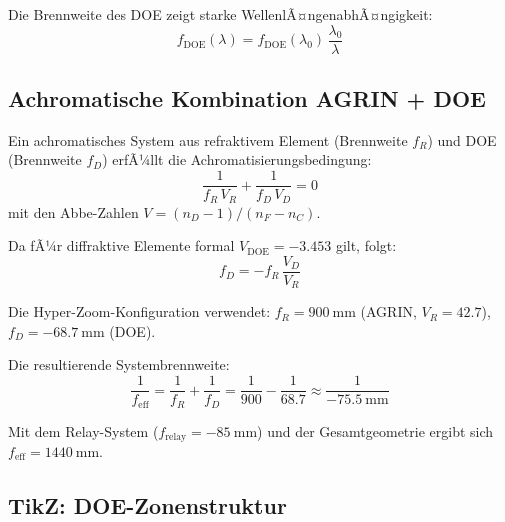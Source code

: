 ﻿\documentclass[12pt,a4paper]{article}
\theoremstyle{definition}
\newcommand{\eff}{\mathrm{eff}}
\newcommand{\DOE}{\mathrm{DOE}}
\begin{document}
	Die Brennweite des DOE zeigt starke WellenlÃ¤ngenabhÃ¤ngigkeit:
	\begin{equation}
		f_\DOE(\lambda) = f_\DOE(\lambda_0)\,\frac{\lambda_0}{\lambda}
		\label{eq:doe_focal}
	\end{equation}
	
	\subsection{Achromatische Kombination AGRIN + DOE}
	
	Ein achromatisches System aus refraktivem Element (Brennweite $f_R$) und DOE
	(Brennweite $f_D$) erfÃ¼llt die Achromatisierungsbedingung:
	\begin{equation}
		\frac{1}{f_R\,V_R} + \frac{1}{f_D\,V_D} = 0
		\label{eq:achromat}
	\end{equation}
	mit den Abbe-Zahlen $V = (n_D - 1)/(n_F - n_C)$.
	
	Da fÃ¼r diffraktive Elemente formal $V_\DOE = -3.453$ gilt, folgt:
	\begin{equation}
		f_D = -f_R\,\frac{V_D}{V_R}
		\label{eq:doe_focal_achr}
	\end{equation}
	
	Die Hyper-Zoom-Konfiguration verwendet:
	$f_R = \SI{900}{\milli\metre}$ (AGRIN, $V_R = 42.7$),
	$f_D = \SI{-68.7}{\milli\metre}$ (DOE).
	
	Die resultierende Systembrennweite:
	\begin{equation}
		\frac{1}{f_\eff} = \frac{1}{f_R} + \frac{1}{f_D}
		= \frac{1}{900} - \frac{1}{68.7}
		\approx \frac{1}{\SI{-75.5}{\milli\metre}}
	\end{equation}
	
	Mit dem Relay-System ($f_\mathrm{relay} = \SI{-85}{\milli\metre}$)
	und der Gesamtgeometrie ergibt sich $f_\eff = \SI{1440}{\milli\metre}$.
	
	\subsection{TikZ: DOE-Zonenstruktur}
	
\end{document}
